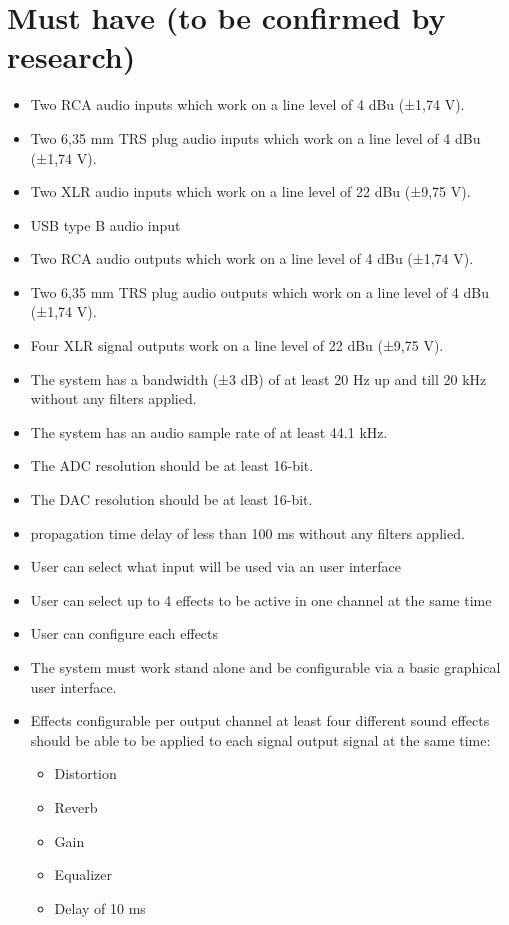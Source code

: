 	\section{Must have (to be confirmed by research)}
	
\begin{itemize}
	\setlength\itemsep{-0.2em}
	\item Two RCA audio inputs which work on a line level of 4 dBu (±1,74 V).
	\item Two 6,35 mm TRS plug audio inputs which work on a line level of 4 dBu (±1,74 V).
	\item Two XLR audio inputs which work on a line level of 22 dBu (±9,75 V).
	\item USB type B audio input
	\item Two RCA audio outputs which work on a line level of 4 dBu (±1,74 V).
	\item Two 6,35 mm TRS plug audio outputs which work on a line level of 4 dBu (±1,74 V).
	\item Four XLR signal outputs work on a line level of 22 dBu (±9,75 V).
	\item The system has a bandwidth (±3 dB) of at least 20 Hz up and till 20 kHz without any filters applied.
	\item The system has an audio sample rate of at least 44.1 kHz.
	\item The ADC resolution should be at least 16-bit.
	\item The DAC resolution should be at least 16-bit.
	\item propagation time delay of less than 100 ms without any filters applied.
	\item User can select what input will be used via an user interface
	\item User can select up to 4 effects to be active in one channel at the same time
	\item User can configure each effects
	\item The system must work stand alone and be configurable via a basic graphical user interface.
	\item Effects configurable per output channel at least four different sound effects should be able to be applied to each signal output signal at the same time:
	\begin{itemize} %
		\item Distortion
		\item Reverb
		\item Gain
		\item Equalizer 
		\item Delay of 10 ms
	\end{itemize}
\end{itemize}
	
